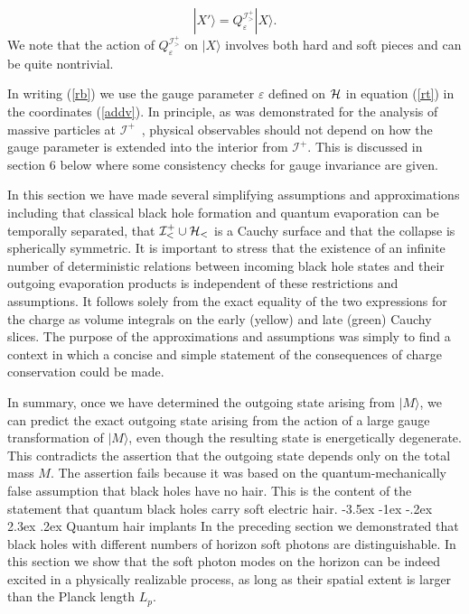 \documentclass[12pt]{article}
\makeatletter
\numberwithin{equation}{section}
\def\ip{${\mathcal I}^+$}
\def\e{{\epsilon}}
\def\ci{{\mathcal I}}
\def\>{\rangle }
\def\ch{{\cal H}}
\newcommand{\be}{\begin{equation}}
\newcommand{\ee}{\end{equation}}
\renewcommand{\epsilon}{\varepsilon}
\renewcommand\section{\@startsection {section}{1}{\z@}%
                                   {-3.5ex \@plus -1ex \@minus -.2ex}%
                                   {2.3ex \@plus.2ex}%
                                   {\normalfont\large\bfseries}}
\makeatother
\begin{document}
\be |X' \>= Q_\e^{\ci^+_>}|X\>.\ee
We note that the action of $Q_\e^{\ci^+_>}$ on $|X\>$ involves both hard and soft pieces and can be quite nontrivial. 

    In writing (\ref{rb}) we use the gauge parameter $\e$ defined on $\ch$ in equation (\ref{rt}) in the coordinates (\ref{addv}). In principle,  as was demonstrated for the analysis of massive particles at \ip\ \cite{Kapec:2015ena},  physical observables should not depend on how the gauge parameter is extended into the interior from $\ci^+$. This is discussed in section 6 below where some consistency checks for gauge invariance are given. 
    
    In this section we have made several simplifying assumptions and approximations including that classical black hole formation and quantum evaporation can be temporally separated, that $\ci^+_<\cup\ch_<$ is a Cauchy surface and that the collapse is spherically symmetric. It is important to stress that the 
 existence of an infinite number of deterministic relations between incoming black hole states and their outgoing evaporation products is independent of these restrictions and assumptions. It follows solely from the exact equality of the two expressions for the charge as volume integrals on the early (yellow) and late (green) Cauchy slices. The purpose of the approximations and assumptions was simply to find a context in which a concise and simple statement of the consequences of charge conservation could be made. 

In summary, once we have determined the outgoing state arising from $|M\>$, we can predict the exact outgoing state arising from the action of a large gauge transformation of  $|M\>$, even though the resulting state is energetically degenerate. This contradicts the assertion that the outgoing state depends only on the total mass $M$.  The assertion fails because it was based on the quantum-mechanically false assumption that  black holes have no hair. This is the content of the statement that quantum black holes carry  soft electric hair. 
\section{Quantum hair implants}
In the preceding section we demonstrated that black holes with different numbers of horizon soft photons
are distinguishable. In this section we  show that the soft photon modes on the horizon can be indeed excited in a physically realizable process, as long as their spatial extent is larger than the Planck length $L_p$.  
\end{document}
